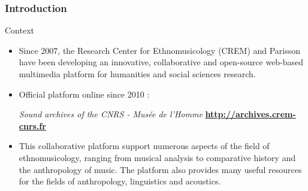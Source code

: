 \documentclass[final, hyperref, table]{beamer}
\begin{document}
\begin{frame}\frametitle{Introduction}
 \begin{block}{Context}
   \begin{itemize}
   \item Since 2007, the Research Center for Ethnomusicology (CREM) and Parisson
     have been developing an innovative, collaborative and
     open-source \alert{web-based multimedia platform} for \alert{humanities and social sciences research}.

   \item Official platform online since 2010 : 
     \vspace{-0.1cm}\begin{center}
\emph{Sound archives of the CNRS - Musée de l'Homme}
       \colorbox{yellow!40} {\bf \url{http://archives.crem-cnrs.fr}}
     \end{center}
   \item This \alert{collaborative} platform support numerous aspects of the field of
     \alert{ethnomusicology}, ranging from musical analysis to comparative
     history and the anthropology of music. The platform also provides
     many useful resources for the fields of anthropology, linguistics
     and acoustics.
   \end{itemize}
\end{block}
\end{frame}
\end{document}

